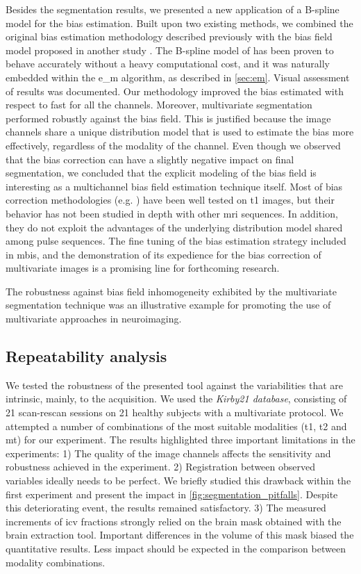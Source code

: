 Besides the segmentation results, we presented a new application of a B-spline model for
  the bias estimation.
Built upon two existing methods, we combined the original bias estimation methodology
  described previously \citep{van_leemput_automated_1999} with the bias field model proposed
  in another study \citep{tustison_n4itk:_2010}.
The B-spline model of \citeauthor{tustison_n4itk:_2010} has been proven to behave accurately
  without a heavy computational cost, and it was naturally embedded within the \gls*{e_m} 
  algorithm, as described in \autoref{sec:em}.
Visual assessment of results was documented.
Our methodology improved the bias estimated with respect to \gls*{fast} for all the channels.
Moreover, multivariate segmentation performed robustly against the bias field.
This is justified because the image channels share a unique distribution model that is used to
  estimate the bias more effectively, regardless of the modality of the channel.
Even though we observed that the bias correction can have a slightly negative impact
  on final segmentation, we concluded that the explicit modeling of the bias field is
  interesting as a multichannel bias field estimation technique itself.
Most of bias correction methodologies (e.g. \cite{tustison_n4itk:_2010}) have been well tested on
  \gls*{t1} images, but their behavior has not been studied in depth with other \gls*{mri} sequences.
In addition, they do not exploit the advantages of the underlying distribution model shared
  among pulse sequences.
The fine tuning of the bias estimation strategy included in \gls*{mbis}, and the demonstration
  of its expedience for the bias correction of multivariate images is a promising
  line for forthcoming research.

The robustness against bias field inhomogeneity exhibited by the multivariate segmentation technique
  was an illustrative example for promoting the use of multivariate approaches in neuroimaging.

\subsection{Repeatability analysis}
We tested the robustness of the presented tool against the variabilities that are intrinsic,
  mainly, to the acquisition.
We used the \emph{Kirby21 database}, consisting of 21 scan-rescan sessions on 21 healthy subjects
  with a multivariate protocol.
We attempted a number of combinations of the most suitable modalities
  (\gls*{t1}, \gls*{t2} and \gls*{mt}) for our experiment.
The results highlighted three important limitations in the experiments:
1) The quality of the image channels affects the sensitivity and robustness achieved in the 
   experiment.
2) Registration between observed variables ideally needs to be perfect.
  We briefly studied this drawback within the first experiment and present the
  impact in \autoref{fig:segmentation_pitfalls}.
  Despite this deteriorating event, the results remained satisfactory.
3) The measured increments of \acrfull*{icv} fractions strongly relied
   on the brain mask obtained with the brain extraction tool.
   Important differences in the volume of this mask
   biased the quantitative results. Less impact should be
   expected in the comparison between modality combinations.

